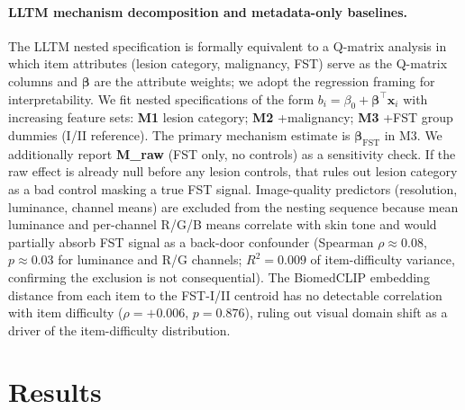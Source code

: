 \documentclass{article}
\begin{document}
\paragraph{LLTM mechanism decomposition and metadata-only baselines.}
\label{sec:lltm}
The LLTM nested specification is formally equivalent to a Q-matrix analysis \citep{tatsuoka1983rule} in which item attributes (lesion category, malignancy, FST) serve as the Q-matrix columns and $\boldsymbol{\beta}$ are the attribute weights; we adopt the regression framing for interpretability. We fit nested specifications of the form $b_i = \beta_0 + \boldsymbol{\beta}^\top \mathbf{x}_i$ with increasing feature sets: \textbf{M1} lesion category; \textbf{M2} +malignancy; \textbf{M3} +FST group dummies (I/II reference). The primary mechanism estimate is $\boldsymbol{\beta}_{\text{FST}}$ in M3. We additionally report \textbf{M\_raw} (FST only, no controls) as a sensitivity check. If the raw effect is already null before any lesion controls, that rules out lesion category as a bad control masking a true FST signal. Image-quality predictors (resolution, luminance, channel means) are excluded from the nesting sequence because mean luminance and per-channel R/G/B means correlate with skin tone and would partially absorb FST signal as a back-door confounder (Spearman $\rho \approx 0.08$, $p \approx 0.03$ for luminance and R/G channels; $R^2 = 0.009$ of item-difficulty variance, confirming the exclusion is not consequential). The BiomedCLIP embedding distance from each item to the FST-I/II centroid has no detectable correlation with item difficulty ($\rho = +0.006$, $p = 0.876$), ruling out visual domain shift as a driver of the item-difficulty distribution. 

\section{Results}
\label{sec:results}
\end{document}
